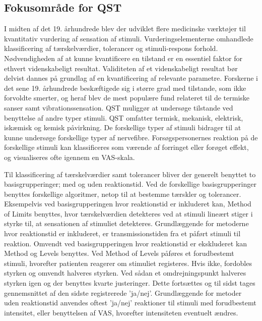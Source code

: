 \subsection{Fokusområde for QST}
I midten af det 19. århundrede blev der udviklet flere medicinske værktøjer til kvantitativ vurdering af sensation af stimuli. Vurderingselementerne omhandlede klassificering af tærskelværdier, tolerancer og stimuli-respons forhold. Nødvendigheden af at kunne kvantificere en tilstand er en essentiel faktor for ethvert videnskabeligt resultat. Validiteten af et videnskabeligt resultat bør  delvist dannes på grundlag af en kvantificering af relevante parametre. \citep{Yarnitsky1997} \citep{Yarnitsky2006} Forskerne i det sene 19. århundrede beskæftigede sig i større grad med tilstande, som ikke forvoldte smerter, og heraf blev de mest populære fund relateret til de termiske sanser samt vibrationssensation. \citep{Yarnitsky1997} QST muliggør at undersøge tilstande ved benyttelse af andre typer stimuli. QST omfatter termisk, mekanisk, elektrisk, iskæmisk og kemisk påvirkning. \citep{Yarnitsky2006} De forskellige typer af stimuli bidrager til at kunne undersøge forskellige typer af nervefibre. Forsøgspersonernes reaktion på de forskellige stimuli kan klassificeres som værende af forringet eller forøget effekt, og visualiseres ofte igennem en VAS-skala. \citep{Yarnitsky2006}

Til klassificering af tærskelværdier samt tolerancer bliver der generelt benyttet to basisgrupperinger; med og uden reaktionstid. Ved de forskellige basisgrupperinger benyttes forskellige algoritmer, netop til at bestemme tærskler og tolerancer. Eksempelvis ved basisgrupperingen hvor reaktionstid er inkluderet kan, Method of Limits benyttes, hvor tærskelværdien detekteres ved at stimuli lineært stiger i styrke til, at sensationen af stimuliet detekteres. Grundlæggende for metoderne hvor reaktionstid er inkluderet, er transmissionstiden fra et påført stimuli til reaktion. Omvendt ved basisgrupperingen hvor reaktionstid er ekskluderet kan Method og Levels benyttes. Ved Method of Levels påføres et forudbestemt stimuli, hvorefter patienten reagerer om stimuliet registeres. Hvis ikke, fordobles styrken og omvendt halveres styrken. Ved sådan et omdrejningspunkt halveres styrken igen og der benyttes kvarte justeringer. Dette fortsættes og til sidst tages gennemsnittet af den sidste registrerede 'ja/nej'. Grundlæggende for metoder uden reaktionstid anvendes oftest 'ja/nej' reaktioner til stimuli med forudbestemt intensitet, eller benyttelsen af VAS, hvorefter intensiteten eventuelt ændres. \citep{Yarnitsky1997} \citep{Yarnitsky2006} 

